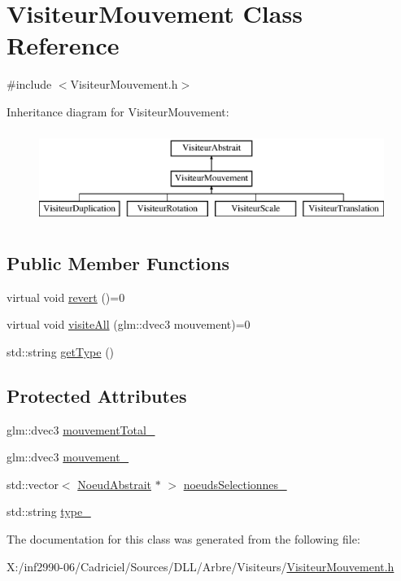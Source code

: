 \hypertarget{class_visiteur_mouvement}{\section{Visiteur\-Mouvement Class Reference}
\label{class_visiteur_mouvement}
}


{\ttfamily \#include $<$Visiteur\-Mouvement.\-h$>$}

Inheritance diagram for Visiteur\-Mouvement\-:\begin{figure}[H]
\begin{center}
\leavevmode
\includegraphics[height=3.000000cm]{class_visiteur_mouvement}
\end{center}
\end{figure}
\subsection*{Public Member Functions}
\begin{DoxyCompactItemize}
\item 
virtual void \hyperlink{group__inf2990_gadef14507d05f0ca946d779575fd8e800}{revert} ()=0
\item 
virtual void \hyperlink{group__inf2990_ga7f60b6bb24b8b4c81c5d62ce37c418c8}{visite\-All} (glm\-::dvec3 mouvement)=0
\item 
std\-::string \hyperlink{group__inf2990_ga9d7f8454641ff2b3da3f4e4171c05695}{get\-Type} ()
\end{DoxyCompactItemize}
\subsection*{Protected Attributes}
\begin{DoxyCompactItemize}
\item 
glm\-::dvec3 \hyperlink{group__inf2990_gabf8be4132bd566dfd54ff567c6224ef6}{mouvement\-Total\-\_\-}
\item 
glm\-::dvec3 \hyperlink{group__inf2990_gadfa30780cc765e2118c90c10007c1715}{mouvement\-\_\-}
\item 
std\-::vector$<$ \hyperlink{class_noeud_abstrait}{Noeud\-Abstrait} $\ast$ $>$ \hyperlink{group__inf2990_ga2ac4578b61df82b961c32da544541b73}{noeuds\-Selectionnes\-\_\-}
\item 
std\-::string \hyperlink{group__inf2990_gad2d8d1980d0be08ffdf44e0e5e3df09f}{type\-\_\-}
\end{DoxyCompactItemize}


The documentation for this class was generated from the following file\-:\begin{DoxyCompactItemize}
\item 
X\-:/inf2990-\/06/\-Cadriciel/\-Sources/\-D\-L\-L/\-Arbre/\-Visiteurs/\hyperlink{_visiteur_mouvement_8h}{Visiteur\-Mouvement.\-h}\end{DoxyCompactItemize}
